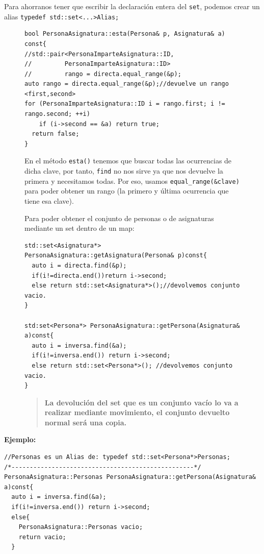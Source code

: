 Para ahorranos tener que escribir la declaración entera del \texttt{set}, podemos crear un alias \texttt{typedef std::set<...>Alias;}

\begin{figure}[h]
  \begin{center}
    \begin{lstlisting}[frame=single]
bool PersonaAsignatura::esta(Persona& p, Asignatura& a) const{ 
//std::pair<PersonaImparteAsignatura::ID,
//         PersonaImparteAsignatura::ID>
//         rango = directa.equal_range(&p);
auto rango = directa.equal_range(&p);//devuelve un rango <first,second>
for (PersonaImparteAsignatura::ID i = rango.first; i != rango.second; ++i)
    if (i->second == &a) return true;
  return false;
}
  \end{lstlisting}
  \end{center}
En el método \texttt {esta()} tenemos que buscar todas las ocurrencias de dicha clave, por tanto, \texttt{find} no nos sirve ya que nos devuelve la primera y necesitamos todas. Por eso, usamos \texttt{equal\_range(\&clave)}
 para poder obtener un rango (la primero y última ocurrencia que tiene esa clave).

Para poder obtener el conjunto de personas o de asignaturas mediante un set dentro de un map:
\end{figure}
\begin{figure}[h]
  \begin{center}
    \begin{lstlisting}[frame=single]
std::set<Asignatura*> PersonaAsignatura::getAsignatura(Persona& p)const{
  auto i = directa.find(&p);
  if(i!=directa.end())return i->second;
  else return std::set<Asignatura*>();//devolvemos conjunto vacio.
}

std:set<Persona*> PersonaAsignatura::getPersona(Asignatura& a)const{
  auto i = inversa.find(&a);
  if(i!=inversa.end()) return i->second;
  else return std::set<Persona*>(); //devolvemos conjunto vacio.
}
  \end{lstlisting}
  \end{center}
  \begin{quote}
    \textbf{La devolución del set que es un conjunto vacío lo va a realizar mediante movimiento, el conjunto devuelto normal será una copia.}
  \end{quote}
\end{figure}



\newpage 
\textbf{\large{Ejemplo:}}
\begin{center}
	\begin{lstlisting}[frame=single]
//Personas es un Alias de: typedef std::set<Persona*>Personas;
/*--------------------------------------------------*/
PersonaAsignatura::Personas PersonaAsignatura::getPersona(Asignatura& a)const{
  auto i = inversa.find(&a);
  if(i!=inversa.end()) return i->second;
  else{
    PersonaAsignatura::Personas vacio;
    return vacio;
  }
	\end{lstlisting}
\end{center}

